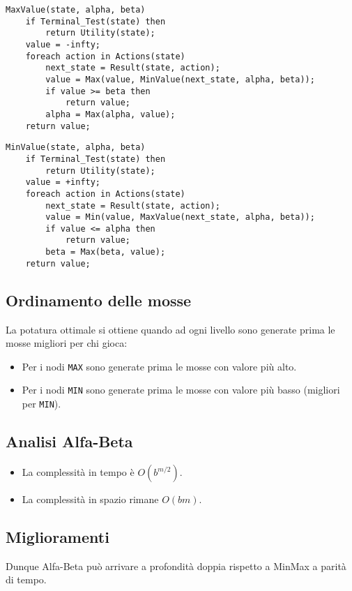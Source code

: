 \begin{lstlisting}[style=pseudo-style]
MaxValue(state, alpha, beta)
	if Terminal_Test(state) then
		return Utility(state);
	value = -infty;
	foreach action in Actions(state)
		next_state = Result(state, action);
		value = Max(value, MinValue(next_state, alpha, beta));
		if value >= beta then
			return value;
		alpha = Max(alpha, value);
	return value;
\end{lstlisting}

\begin{lstlisting}[style=pseudo-style]
MinValue(state, alpha, beta)
	if Terminal_Test(state) then
		return Utility(state);
	value = +infty;
	foreach action in Actions(state)
		next_state = Result(state, action);
		value = Min(value, MaxValue(next_state, alpha, beta));
		if value <= alpha then
			return value;
		beta = Max(beta, value);
	return value;
\end{lstlisting}

\subsection{Ordinamento delle mosse}
La potatura ottimale si ottiene quando ad ogni livello sono generate prima le mosse migliori per chi gioca:
\begin{itemize}
	\item Per i nodi \verb|MAX| sono generate prima le mosse con valore pi\`u alto.
	\item Per i nodi \verb|MIN| sono generate prima le mosse con valore pi\`u basso (migliori per \verb|MIN|).
\end{itemize}

\subsection{Analisi Alfa-Beta}
\begin{itemize}
	\item La complessit\`a in tempo \`e $O(b^{m/2})$.
	\item La complessit\`a in spazio rimane $O(bm)$.
\end{itemize}

\subsection{Miglioramenti}
Dunque Alfa-Beta pu\`o arrivare a profondit\`a doppia rispetto a MinMax a parit\`a di tempo.


